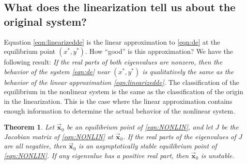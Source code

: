 \documentclass[reqno]{immbook}
\newcommand{\BX}{\vec{\textbf{x}}}
\numberwithin{equation}{chapter}
\newtheorem{theorem}{Theorem}
\numberwithin{question}{section}
\numberwithin{theorem}{chapter}
\numberwithin{figure}{chapter}
\theoremstyle{definition}
\begin{document}
\subsection*{What does the linearization tell us about the original system?}
Equation \eqref{eqn:linearizedde}
is the linear approximation to \eqref{eqn:de} at the
equilibrium point $(x^*,y^*)$.
How ``good'' is this approximation?
We have the following result:
\emph{If the real parts of both eigenvalues
are nonzero, then the behavior of the system \eqref{eqn:de}
near $(x^*,y^*)$ is qualitatively the same as the behavior of the
linear approximation \eqref{eqn:linearizedde}.}
The classification of the equilibrium in the nonlinear system
is the same as the classification of the origin in
the linearization.
This is the case where the linear approximation contains
enough information to determine the actual behavior of the
nonlinear system.

\begin{theorem}
Let $\BX_0$ be an equilibrium point of
\eqref{eqn:NONLIN}, and let $J$ be the Jacobian
matrix of \eqref{eqn:NONLIN} at $\BX_0$.
If the real parts of the eigenvalues of $J$
are all negative, then $\BX_0$ is an
asymptotically stable equilibrium point
of \eqref{eqn:NONLIN}.
If any eigenvalue has a positive real part,
then $\BX_0$ is unstable.
\end{theorem}
\end{document}
